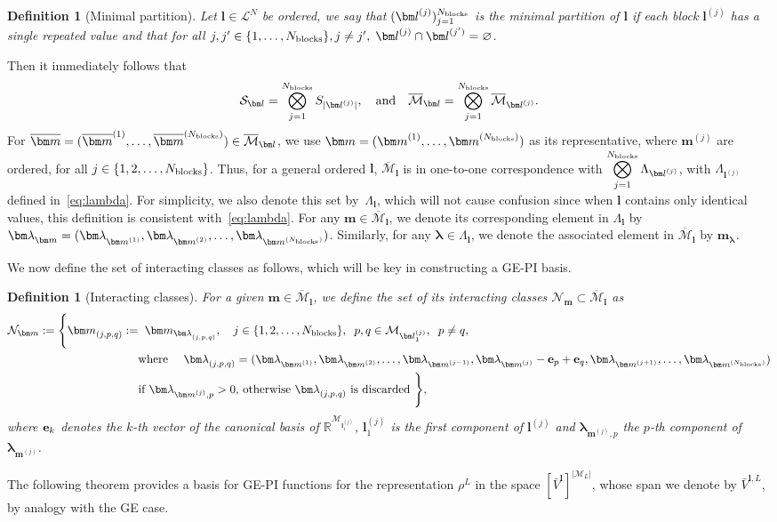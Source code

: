 \documentclass{article}
\newcommand{\rep}[2]{\rho^{#1}_{#2}}
\newcommand{\blamb}[2]{\bm\lambda^{#1}_{#2}}
\newcommand{\bV}{{\bar V}}
\newcommand{\card}[1]{|{#1}|}
\newtheorem{definition}[theorem]{Definition}
\numberwithin{equation}{section}
\def\R{\mathbb{R}}
\def\Nb{{N_{\rm blocks}}}
\def\bl{{\bm l}}
\def\bbm{{\bm m}}
\def\obm{{\overline\bbm}}
\def\calN{\mathcal{N}}
\def\calM{\mathcal{M}}
\def\calL{\mathcal{L}}
\def\calS{\mathcal{S}}
\def\oMl{\overline{\calM}_\bl}
\def\Nat{{N}}
\begin{document}
{\begin{definition}[Minimal partition]
    Let $\bl\in\calL^\Nat$ be ordered, we say that $(\bl^{(j)})_{j=1}^{\Nb}$ is the minimal partition of $\bl$ if each block $\bl^{(j)}$ has a single repeated value and that for all $j,j'\in\{1,\ldots,\Nb\},j\neq j', \; \bl^{(j)}\cap\bl^{(j')}=\varnothing$.
\end{definition}

Then it immediately follows that 
\[
     \calS_{\bl} = \bigotimes_{j=1}^\Nb S_{|\bl^{(j)}|},
\quad 
\text{and}
\quad
     \oMl = \bigotimes_{j=1}^\Nb \overline{\calM}_{\bl^{(j)}}.
\]
For $\obm=(\obm^{(1)}, \ldots, \obm^{(\Nb)})\in\oMl$, we use $\bbm = (\bbm^{(1)}, \ldots, \bbm^{(\Nb)})$ as its representative, where $\bbm^{(j)}$ are ordered, for all $j\in\{1,2,\ldots,\Nb\}$. 
Thus, for a general ordered $\bl$, $\oMl$ is in one-to-one correspondence with 
$\displaystyle \bigotimes_{j=1}^\Nb \Lambda_{\bl^{(j)}}$, 
with $\Lambda_{\bl^{(j)}}$ defined in~\eqref{eq:lambda}. For simplicity, we also denote this set by~$\Lambda_{\bl}$, which will not cause confusion since when $\bl$ contains only identical values, this definition is consistent with~\eqref{eq:lambda}.
For any $\bbm\in\oMl$, we denote its corresponding element in $\Lambda_{\bl}$ by $\blamb{}{\bbm}=(\blamb{}{\bbm^{(1)}},\blamb{}{\bbm^{(2)}},\ldots,\blamb{}{\bbm^{(\Nb)}})$. Similarly, for any $\blamb{}{} \in \Lambda_\bl$, we denote the associated element in $\oMl$ by $\bbm_{\blamb{}{}}$. 

We now define the set of interacting classes as follows, which will be key in constructing a GE-PI basis.

\begin{definition}[Interacting classes]
    For a given $\bbm\in\oMl$, we define the set of its interacting classes $\calN_\bbm\subset\oMl$ as 
    \begin{equation}
        \label{eq:interacting_classes}
         \begin{split}
     \calN_\bbm := 
     \Bigg\{\bbm^{}_{(j,p,q)}:= &\;\;\bbm_{\blamb{}{(j,p,q)}},
     \quad 
     j\in\{1,2,\ldots,\Nb\}, \;\; p,q\in\calM_{\bl^{(j)}_1},\;\; p\ne q, \\
     &
     \textup{where } \quad 
     \blamb{}{(j,p,q)}
     =  (\blamb{}{\bbm^{(1)}},\blamb{}{\bbm^{(2)}},\ldots,\blamb{}{\bbm^{(j-1)}},\blamb{}{\bbm^{(j)}} - {\bf e}_p + {\bf e}_q,\blamb{}{\bbm^{(j+1)}},\ldots,\blamb{}{\bbm^{(\Nb)}})\\
     & \textup{if $\blamb{}{\bbm^{(j)},p}> 0$, otherwise   $ \blamb{}{(j,p,q)}$ is discarded }
     \Bigg\},
 \end{split}
    \end{equation}
where ${\bf e}_k$ denotes the $k$-th vector of the canonical basis of $\R^{\calM_{\bl^{(j)}_1}}$, $\bl^{(j)}_1$ is the first component of $\bl^{(j)}$ and $\blamb{}{\bbm^{(j)},p}$ the $p$-th component of $\blamb{}{\bbm^{(j)}}$. 
\end{definition}
The following theorem provides a basis for GE-PI functions for the representation $\rep{L}{}$ in the space $\left[ \bV^{\bl} \right]^{\card{\calM_L}}$, whose span we denote by $\bV^{\bl,L}$, by analogy with the GE case.


}
\end{document}
